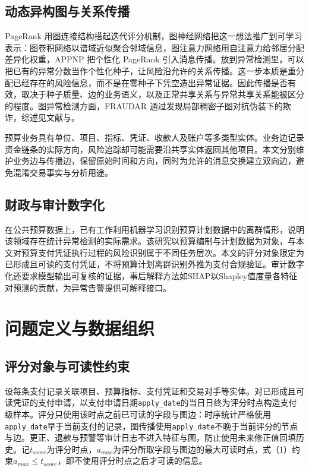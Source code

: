 \documentclass[a4paper,fleqn]{cas-dc}
\begin{document}
\subsection{动态异构图与关系传播}
PageRank 用图连接结构搭起迭代评分机制\cite{ref29}，图神经网络把这一想法推广到可学习表示：图卷积网络以谱域近似聚合邻域信息\cite{ref30}，图注意力网络用自注意力给邻居分配差异化权重\cite{ref31}，APPNP 把个性化 PageRank 引入消息传播\cite{ref32}。放到异常检测里，可以把已有的异常分数当作个性化种子，让风险沿允许的关系传播。这一步本质是重分配已经存在的风险信息，而不是在零种子下凭空造出异常证据。因此传播是否有效，取决于种子质量、边的业务语义，以及正常共享关系与异常共享关系能被区分的程度。图异常检测方面，FRAUDAR 通过发现局部稠密子图对抗伪装下的欺诈\cite{ref33}，综述见文献\cite{ref34}与\cite{ref35}。

预算业务具有单位、项目、指标、凭证、收款人及账户等多类型实体。业务边记录资金链条的实际方向，风险追踪却可能需要沿共享实体返回其他项目。本文分别维护业务边与传播边，保留原始时间和方向，同时为允许的消息交换建立双向边，避免混淆交易事实与分析用途。

\subsection{财政与审计数字化}
在公共预算数据上，已有工作利用机器学习识别预算计划数据中的离群情形，说明该领域存在统计异常检测的实际需求\cite{ref36}。该研究以预算编制与计划数据为对象，与本文对预算支付凭证执行过程的风险识别属于不同任务层次。本文的评分对象限定为已形成且可读的支付凭证，不将预算计划离群识别外推为支付合规验证。审计数字化还要求模型输出可复核的证据，事后解释方法如SHAP以Shapley值度量各特征对预测的贡献，为异常告警提供可解释接口\cite{ref37}。

\section{问题定义与数据组织}
\subsection{评分对象与可读性约束}
设每条支付记录关联项目、预算指标、支付凭证和交易对手等实体。对已形成且可读凭证的支付申请，以支付申请日期\texttt{apply\_date}的当日日终为评分时点构造支付级样本。评分只使用该时点之前已可读的字段与图边：时序统计严格使用\texttt{apply\_date}早于当前支付的记录，图传播使用\texttt{apply\_date}不晚于当前评分的节点与边。更正、退款与预警等审计日志不进入特征与图，防止使用未来修正值回填历史。记$t_{score}$为评分时点，$a_{max}$为评分所取字段与图边的最大可读时点，式（1）约束$a_{max}$$\le$$t_{score}$，即不使用评分时点之后才可读的信息。
\end{document}
